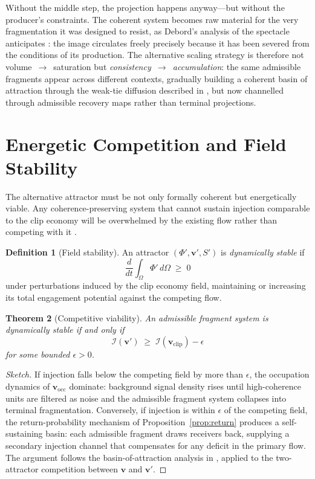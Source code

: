\documentclass{amsart}
\theoremstyle{plain}
\newtheorem{theorem}{Theorem}[section]
\theoremstyle{definition}
\newtheorem{definition}[theorem]{Definition}
\theoremstyle{remark}
\newcommand{\scalar}{\Phi}
\newcommand{\vfield}{\mathbf{v}}
\newcommand{\entr}{S}
\newcommand{\vocc}{\mathbf{v}_{\!\text{occ}}}
\newcommand{\Inj}{\mathcal{I}}
\begin{document}
Without the middle step, the projection happens anyway---but without the producer's
constraints.  The coherent system becomes raw material for the very fragmentation
it was designed to resist, as Debord's analysis of the spectacle anticipates
\cite{debord1967}: the image circulates freely precisely because it has been
severed from the conditions of its production.  The alternative scaling strategy is
therefore not volume~$\to$~saturation but \emph{consistency~$\to$~accumulation}:
the same admissible fragments appear across different contexts, gradually building
a coherent basin of attraction through the weak-tie diffusion described in
\cite{granovetter1973}, but now channelled through admissible recovery maps rather
than terminal projections.

\section{Energetic Competition and Field Stability}
\label{sec:energetics}

The alternative attractor must be not only formally coherent but energetically
viable.  Any coherence-preserving system that cannot sustain injection comparable
to the clip economy will be overwhelmed by the existing flow rather than competing
with it \cite{cross1993,strogatz2018}.

\begin{definition}[Field stability]
  \label{def:stability}
  An attractor $(\scalar', \vfield', \entr')$ is \emph{dynamically stable} if
  \[
    \frac{d}{dt} \int_{\Omega} \scalar' \, d\Omega \;\geq\; 0
  \]
  under perturbations induced by the clip economy field, maintaining or increasing
  its total engagement potential against the competing flow.
\end{definition}

\begin{theorem}[Competitive viability]
  \label{thm:viability}
  An admissible fragment system is dynamically stable if and only if
  \[
    \Inj(\vfield') \;\geq\; \Inj(\vfield_{\text{clip}}) - \epsilon
  \]
  for some bounded $\epsilon > 0$.
\end{theorem}

\begin{proof}[Sketch]
  If injection falls below the competing field by more than $\epsilon$, the
  occupation dynamics of $\vocc$ dominate: background signal density rises until
  high-coherence units are filtered as noise and the admissible fragment system
  collapses into terminal fragmentation.  Conversely, if injection is within
  $\epsilon$ of the competing field, the return-probability mechanism of
  Proposition~\ref{prop:return} produces a self-sustaining basin: each admissible
  fragment draws receivers back, supplying a secondary injection channel that
  compensates for any deficit in the primary flow.  The argument follows the
  basin-of-attraction analysis in \cite{strogatz2018}, applied to the
  two-attractor competition between $\vfield$ and $\vfield'$.
\end{proof}
\end{document}

